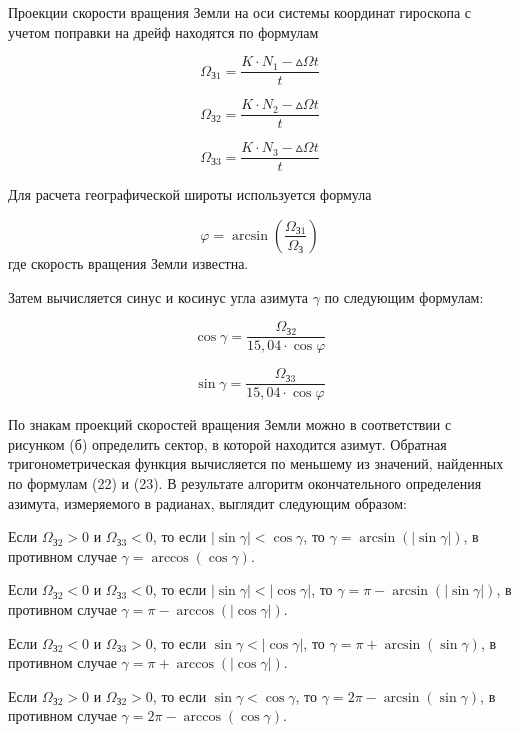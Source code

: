 \documentclass[a4paper,12pt]{article} %
\begin{document}
Проекции скорости вращения Земли на оси системы координат гироскопа с
учетом поправки на дрейф находятся по формулам

\begin{equation}
    \Omega_\text{З1} = \frac {K \cdot N_1 - \vartriangle \!\! \Omega t}
    {t}
\end{equation}

\begin{equation}
    \Omega_\text{З2} = \frac {K \cdot N_2 - \vartriangle \!\! \Omega t}
    {t}
\end{equation}

\begin{equation}
    \Omega_\text{З3} = \frac {K \cdot N_3 - \vartriangle \!\! \Omega t}
    {t}
\end{equation}

Для расчета географической широты используется формула

\begin{equation}
    \varphi = \arcsin(\frac{\Omega_\text{З1}} {\Omega_\text{З}})
\end{equation}
где скорость вращения Земли известна.

Затем вычисляется синус и косинус угла азимута $\gamma$ по следующим формулам:

\begin{equation}
    \cos \gamma = \frac {\Omega_\text{З2}} {15,04 \cdot \cos \varphi}
\end{equation}

\begin{equation}
    \sin \gamma = \frac {\Omega_\text{З3}} {15,04 \cdot \cos \varphi}
\end{equation}

По знакам проекций скоростей вращения Земли можно в соответствии с рисунком (б) определить сектор, в которой находится азимут. Обратная тригонометрическая функция вычисляется по меньшему из значений, найденных по
формулам (22) и (23). В результате алгоритм окончательного определения азимута, измеряемого в радианах, выглядит следующим образом:

Если $\Omega_\text{З2} > 0$ и $\Omega_\text{З3} < 0$, то если $|\sin\gamma| < \cos\gamma$, то $\gamma = \arcsin(|\sin\gamma|)$, в противном случае $\gamma = \arccos(\cos \gamma)$.

Если $\Omega_\text{З2} < 0$ и $\Omega_\text{З3} < 0$, то если $|\sin\gamma| < |\cos\gamma|$, то $\gamma = \pi - \arcsin(|\sin\gamma|)$, в противном случае $\gamma = \pi - \arccos(|\cos\gamma|)$.

Если $\Omega_\text{З2} < 0$ и $\Omega_\text{З3} > 0$, то если $\sin\gamma < |\cos\gamma|$, то $\gamma = \pi + \arcsin(\sin\gamma)$, в противном случае $\gamma = \pi + \arccos(|\cos\gamma|)$.

Если $\Omega_\text{З2} > 0$ и $\Omega_\text{З2} > 0$, то если $\sin\gamma < \cos\gamma$, то $\gamma = 2\pi - \arcsin(\sin\gamma)$, в противном случае $\gamma = 2\pi - \arccos(\cos\gamma)$.
\end{document}
